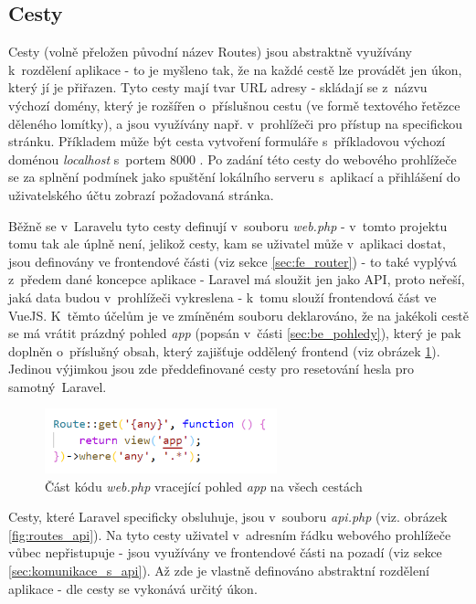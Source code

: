 	\subsection{Cesty}\label{sec:routes} %
	Cesty (volně přeložen původní název Routes) jsou abstraktně využívány k~rozdělení aplikace - to je myšleno tak, že na každé cestě lze provádět jen úkon, který jí je přiřazen. Tyto cesty mají tvar URL adresy - skládají se z~názvu výchozí domény, který je rozšířen o~příslušnou cestu (ve formě textového řetězce děleného lomítky), a jsou využívány např. v~prohlížeči pro přístup na specifickou stránku. Příkladem může být cesta vytvoření formuláře s~příkladovou výchozí doménou \textit{localhost} s~portem 8000 \textit{}. Po zadání této cesty do webového prohlížeče se za splnění podmínek jako spuštění lokálního serveru s~aplikací a přihlášení do uživatelského účtu zobrazí požadovaná stránka.
	
	Běžně se v~Laravelu tyto cesty definují v~souboru \textit{web.php} - v~tomto projektu tomu tak ale úplně není, jelikož cesty, kam se uživatel může v~aplikaci dostat, jsou definovány ve frontendové části (viz sekce \ref{sec:fe_router}) - to také vyplývá z~předem dané koncepce aplikace - Laravel má sloužit jen jako API, proto neřeší, jaká data budou v~prohlížeči vykreslena - k~tomu slouží frontendová část ve VueJS. K~těmto účelům je ve zmíněném souboru deklarováno, že na jakékoli cestě se má vrátit prázdný pohled \textit{app} (popsán v~části \ref{sec:be_pohledy}), který je pak doplněn o~příslušný obsah, který zajišťuje oddělený frontend (viz obrázek \ref{fig:routes_web}). Jedinou výjimkou jsou zde předdefinované cesty pro resetování hesla pro samotný~Laravel.
	
	\begin{figure}[H]
		\centering %
		\includegraphics[width=0.6\textwidth]{img/routes/web_routes.png} %
		\caption{Část kódu \textit{web.php} vracející pohled \textit{app} na všech cestách} %
		\label{fig:routes_web} %
	\end{figure}
	
	Cesty, které Laravel specificky obsluhuje, jsou v~souboru \textit{api.php} (viz. obrázek \ref{fig:routes_api}). Na tyto cesty uživatel v~adresním řádku webového prohlížeče vůbec nepřistupuje - jsou využívány ve frontendové části na pozadí (viz sekce \ref{sec:komunikace_s_api}). Až zde je vlastně definováno abstraktní rozdělení aplikace - dle cesty se vykonává určitý úkon. 
	
